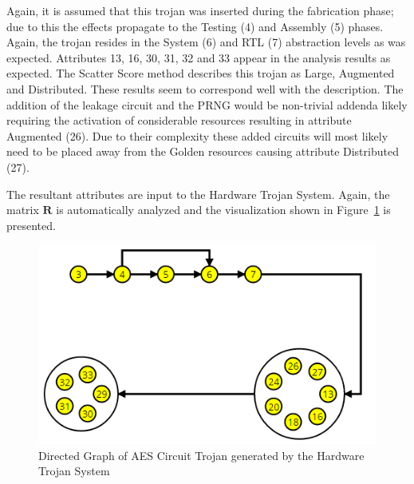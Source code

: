 \documentclass[journal, hidelinks]{IEEEtran}
\begin{document}
Again, it is assumed that this trojan was inserted during the fabrication phase; due to this the effects propagate to the Testing (4) and Assembly (5) phases.
Again, the trojan resides in the System (6) and RTL (7) abstraction levels as was expected.
Attributes 13, 16, 30, 31, 32 and 33 appear in the analysis results as expected.
The Scatter Score method describes this trojan as Large, Augmented and Distributed. 
These results seem to correspond well with the description. 
The addition of the leakage circuit and the PRNG would be non-trivial addenda likely requiring the activation of considerable resources resulting in attribute Augmented (26).
Due to their complexity these added circuits will most likely need to be placed away from the Golden resources causing attribute Distributed (27).

The resultant attributes are input to the Hardware Trojan System.
Again, the matrix $\mathbf{R}$ is automatically analyzed and the visualization shown in Figure~\ref{fig:aesVisual} is presented.
\begin{figure}[h]
	\centering
	\includegraphics[width=0.91\linewidth]{Figures/aesVisual}
	\caption{Directed Graph of AES Circuit Trojan generated by the Hardware Trojan System}
	\label{fig:aesVisual}
\end{figure}

\end{document}
